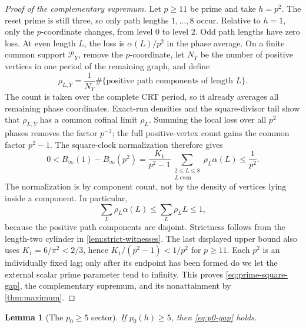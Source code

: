 \documentclass[12pt,a4paper]{article}
\newtheorem{lemma}[theorem]{Lemma}
\theoremstyle{definition}
\newcommand{\Pp}{\mathcal P}
\newcommand{\Bin}{B_\infty}
\begin{document}
\begin{proof}[Proof of the complementary supremum]
Let \(p\geq11\) be prime and take \(h=p^2\).  The reset prime is still three,
so only path lengths \(1,\ldots,8\) occur.  Relative to \(h=1\), only the
\(p\)-coordinate changes, from level \(0\) to level \(2\).  Odd path lengths
have zero loss.  At even length \(L\), the loss is
\(\alpha(L)/p^2\) in the phase average.  On a finite common support
\(\Pp_Y\), remove the \(p\)-coordinate, let \(N_Y\) be the number of positive
vertices in one period of the remaining graph, and define
\[
 \rho_{L,Y}=\frac1{N_Y}
 \#\{\text{positive path components of length }L\}.
\]
The count is taken over the complete CRT period, so it already averages all
remaining phase coordinates.  Exact-run densities and the square-divisor tail
show that \(\rho_{L,Y}\) has a common cofinal limit \(\rho_L\).  Summing the
local loss over all \(p^2\) phases removes the factor \(p^{-2}\); the full
positive-vertex count gains the common factor \(p^2-1\).  The square-clock
normalization therefore gives
\[
 0<\Bin(1)-\Bin(p^2)
 =\frac{K_1}{p^2-1}
 \sum_{\substack{2\leq L\leq8\\L\ \mathrm{even}}}
 \rho_L\alpha(L)
 \leq\frac1{p^2}.
\]
The normalization is by component count, not by the density of vertices lying
inside a component.  In particular,
\[
 \sum_L\rho_L\alpha(L)\leq
 \sum_L\rho_LL\leq1,
\]
because the positive path components are disjoint.  Strictness follows from the
length-two cylinder in \cref{lem:strict-witnesses}.  The last displayed upper
bound also uses \(K_1=6/\pi^2<2/3\), hence
\(K_1/(p^2-1)<1/p^2\) for \(p\geq11\).  Each \(p^2\) is an
individually fixed lag; only after its endpoint has been formed do we let the
external scalar prime parameter tend to infinity.  This proves
\eqref{eq:prime-square-gap}, the complementary supremum, and its
nonattainment by \cref{thm:maximum}.
\end{proof}

\begin{lemma}[The \(p_0\geq5\) sector]
\label{lem:uniform-gap}
If \(p_0(h)\geq5\), then \eqref{eq:p0-gap} holds.
\end{lemma}
\end{document}

